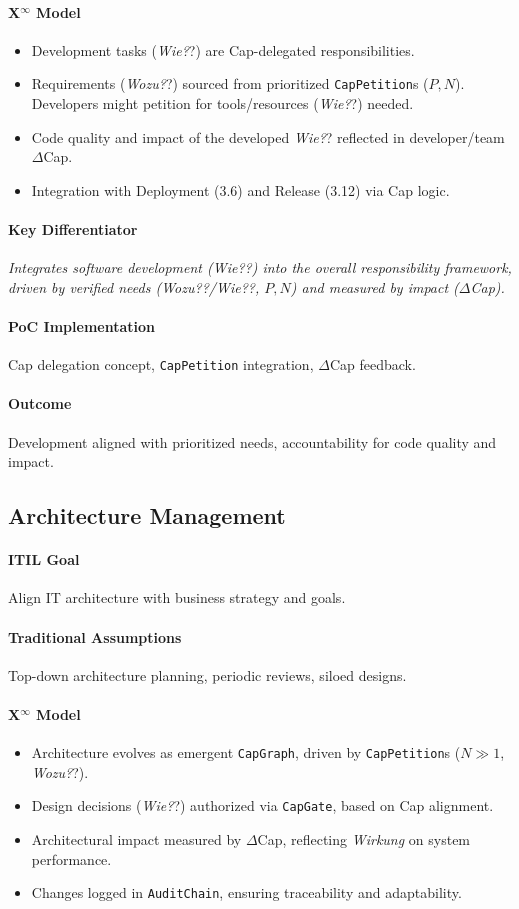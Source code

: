 \documentclass[12pt, a4paper]{scrartcl}
\newcommand{\Xinf}{X$^\infty$}                        %
\newcommand{\DeltaCap}{$\Delta$Cap}                    %
\newcommand{\Wirkung}{\textit{Wirkung}}                 %
\newcommand{\CapGate}{\texttt{CapGate}}
\newcommand{\AuditChain}{\texttt{AuditChain}}
\newcommand{\CapPetition}{\texttt{CapPetition}}        %
\newcommand{\Wozu}{\textit{Wozu?}}                      %
\newcommand{\Wie}{\textit{Wie?}}                        %
\begin{document}
\paragraph*{\Xinf{} Model}
\begin{itemize}
    \item Development tasks (\Wie?) are Cap-delegated responsibilities.
    \item Requirements (\Wozu?) sourced from prioritized \CapPetition{}s ($P, N$). Developers might petition for tools/resources (\Wie?) needed.
    \item Code quality and impact of the developed \Wie? reflected in developer/team \DeltaCap{}.
    \item Integration with Deployment (3.6) and Release (3.12) via Cap logic.
\end{itemize}
\paragraph{Key Differentiator} \textit{Integrates software development (\Wie?) into the overall responsibility framework, driven by verified needs (\Wozu?/\Wie?, $P,N$) and measured by impact (\DeltaCap{}).}
\paragraph{PoC Implementation} Cap delegation concept, \CapPetition{} integration, \DeltaCap{} feedback.
\paragraph{Outcome} Development aligned with prioritized needs, accountability for code quality and impact.

\subsection{Architecture Management} %
\paragraph{ITIL Goal} Align IT architecture with business strategy and goals.
\paragraph{Traditional Assumptions} Top-down architecture planning, periodic reviews, siloed designs.
\paragraph*{\Xinf{} Model}
\begin{itemize}
    \item Architecture evolves as emergent \texttt{CapGraph}, driven by \CapPetition{}s ($N \gg 1$, \Wozu?).
    \item Design decisions (\Wie?) authorized via \CapGate{}, based on Cap alignment.
    \item Architectural impact measured by \DeltaCap{}, reflecting \Wirkung{} on system performance.
    \item Changes logged in \AuditChain{}, ensuring traceability and adaptability.
\end{itemize}
\end{document}
